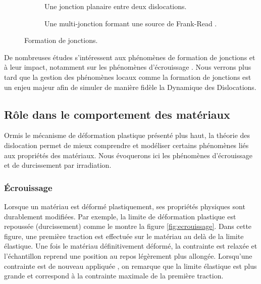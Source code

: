 \documentclass[11pt,class=article,float=false,crop=false]{standalone}
\begin{document}
\begin{figure}[H]
 	\centering
 	\begin{subfigure}[t]{0.49\textwidth}
 		\centering
 		\caption{Une jonction planaire entre deux dislocations.}
 		\label{fig:jonctions:plan}
 	\end{subfigure}
 	\begin{subfigure}[t]{0.49\textwidth}
 		\centering
 		\caption{Une multi-jonction formant une source de Frank-Read .}
 		\label{fig:jonctions:3D}
 	\end{subfigure}	
 	\label{fig:jonctions}
 	\caption{Formation de jonctions.}
\end{figure}

De nombreuses études s'intéressent aux phénomènes de formation de jonctions et à leur impact, notamment sur les phénomènes d'écrouissage . Nous verrons plus tard que la gestion des phénomènes locaux comme la formation de jonctions est un enjeu majeur afin de simuler de manière fidèle la Dynamique des Dislocations.

\subsection{Rôle dans le comportement des matériaux}
\label{sec:DD:effets}

Ormis le mécanisme de déformation plastique présenté plus haut, la théorie des dislocation permet de mieux comprendre et modéliser certains phénomènes liés aux propriétés des matériaux. Nous évoquerons ici les phénomènes d'écrouissage et de durcissement par irradiation.

\subsubsection{Écrouissage}

Lorsque un matériau est déformé plastiquement, ses propriétés physiques sont durablement modifiées. Par exemple, la limite de déformation plastique est repoussée (durcissement) comme le montre la figure \ref{fig:ecrouissage}. Dans cette figure, une première traction est effectuée sur le matériau au delà de la limite élastique. Une fois le matériau définitivement déformé, la contrainte est relaxée et l'échantillon reprend une position au repos légèrement plus allongée. Lorsqu'une contrainte est de nouveau appliquée , on remarque que la limite élastique est plus grande et correspond à la contrainte maximale de la première traction.
\end{document}
